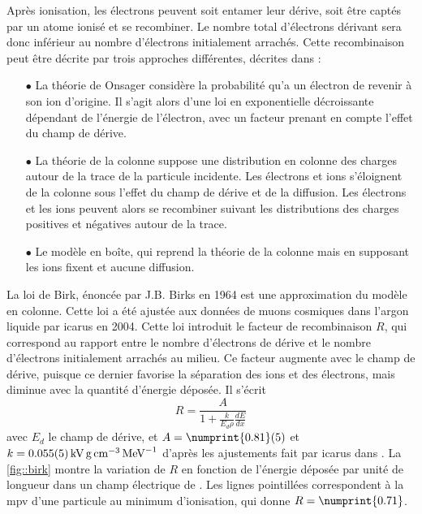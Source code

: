         Après ionisation, les électrons peuvent soit entamer leur dérive, soit être captés par un atome ionisé et se recombiner. Le nombre total d'électrons dérivant sera donc inférieur au nombre d'électrons initialement arrachés. Cette recombinaison peut être décrite par trois approches différentes, décrites dans \cite{Amoruso2004}:
        \begin{itemize}
          \item[$\bullet$] La théorie de Onsager considère la probabilité qu'a un électron de revenir à son ion d'origine. Il s'agit alors d'une loi en exponentielle décroissante dépendant de l'énergie de l'électron, avec un facteur prenant en compte l'effet du champ de dérive.
          \item[$\bullet$] La théorie de la colonne suppose une distribution en colonne des charges autour de la trace de la particule incidente. Les électrons et ions s'éloignent de la colonne sous l'effet du champ de dérive et de la diffusion. Les électrons et les ions peuvent alors se recombiner suivant les distributions des charges positives et négatives autour de la trace.
          \item[$\bullet$] Le modèle en boîte, qui reprend la théorie de la colonne mais en supposant les ions fixent et aucune diffusion.
        \end{itemize}
        La loi de Birk, énoncée par J.B. Birks en 1964\cite{Birk1964} est une approximation du modèle en colonne. Cette loi a été ajustée aux données de muons cosmiques dans l'argon liquide par \gls{icarus} en 2004\cite{Amoruso2004}. Cette loi introduit le facteur de recombinaison $R$, qui correspond au rapport entre le nombre d'électrons de dérive et le nombre d'électrons initialement arrachés au milieu. Ce facteur augmente avec le champ de dérive, puisque ce dernier favorise la séparation des ions et des électrons, mais diminue avec la quantité d'énergie déposée. Il s'écrit
        \begin{equation}\label{eq::birk}
          R=\frac{A}{1+\frac{k}{E_d \rho}\frac{dE}{dx}}
        \end{equation}
        avec $E_d$ le champ de dérive, et $A=\numprint{0.81}(5)$ et $k=\SI{0.055\pm0.005}{\kilo\volt\gram\per\centi\meter\cubed\per\mega\eV}$ d'après les ajustements fait par \gls{icarus} dans \cite{Amoruso2004}. La \autoref{fig::birk} montre la variation de $R$ en fonction de l'énergie déposée par unité de longueur dans un champ électrique de \driftfield{}. Les lignes pointillées correspondent à la \gls{mpv} d'une particule au minimum d'ionisation, qui donne $R=\numprint{0.71}$.

